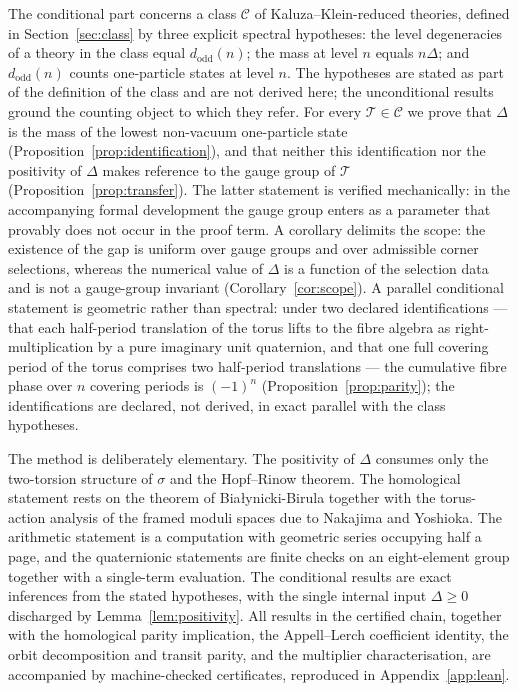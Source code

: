 \documentclass[11pt,a4paper]{article}
\newcommand{\dodd}{d_{\mathrm{odd}}}
\newcommand{\class}{\mathcal{C}}
\newcommand{\thy}{\mathcal{T}}
\theoremstyle{plain}
\theoremstyle{definition}
\theoremstyle{remark}
\begin{document}
The conditional part concerns a class $\class$ of Kaluza--Klein-reduced theories, defined in Section~\ref{sec:class} by three explicit spectral hypotheses: the level degeneracies of a theory in the class equal $\dodd(n)$; the mass at level $n$ equals $n\Delta$; and $\dodd(n)$ counts one-particle states at level $n$. The hypotheses are stated as part of the definition of the class and are not derived here; the unconditional results ground the counting object to which they refer. For every $\thy \in \class$ we prove that $\Delta$ is the mass of the lowest non-vacuum one-particle state (Proposition~\ref{prop:identification}), and that neither this identification nor the positivity of $\Delta$ makes reference to the gauge group of $\thy$ (Proposition~\ref{prop:transfer}). The latter statement is verified mechanically: in the accompanying formal development the gauge group enters as a parameter that provably does not occur in the proof term. A corollary delimits the scope: the existence of the gap is uniform over gauge groups and over admissible corner selections, whereas the numerical value of $\Delta$ is a function of the selection data and is not a gauge-group invariant (Corollary~\ref{cor:scope}). A parallel conditional statement is geometric rather than spectral: under two declared identifications --- that each half-period translation of the torus lifts to the fibre algebra as right-multiplication by a pure imaginary unit quaternion, and that one full covering period of the torus comprises two half-period translations --- the cumulative fibre phase over $n$ covering periods is $(-1)^n$ (Proposition~\ref{prop:parity}); the identifications are declared, not derived, in exact parallel with the class hypotheses.

The method is deliberately elementary. The positivity of $\Delta$ consumes only the two-torsion structure of $\sigma$ and the Hopf--Rinow theorem. The homological statement rests on the theorem of Bia{\l}ynicki-Birula together with the torus-action analysis of the framed moduli spaces due to Nakajima and Yoshioka. The arithmetic statement is a computation with geometric series occupying half a page, and the quaternionic statements are finite checks on an eight-element group together with a single-term evaluation. The conditional results are exact inferences from the stated hypotheses, with the single internal input $\Delta \ge 0$ discharged by Lemma~\ref{lem:positivity}. All results in the certified chain, together with the homological parity implication, the Appell--Lerch coefficient identity, the orbit decomposition and transit parity, and the multiplier characterisation, are accompanied by machine-checked certificates, reproduced in Appendix~\ref{app:lean}.
\end{document}
